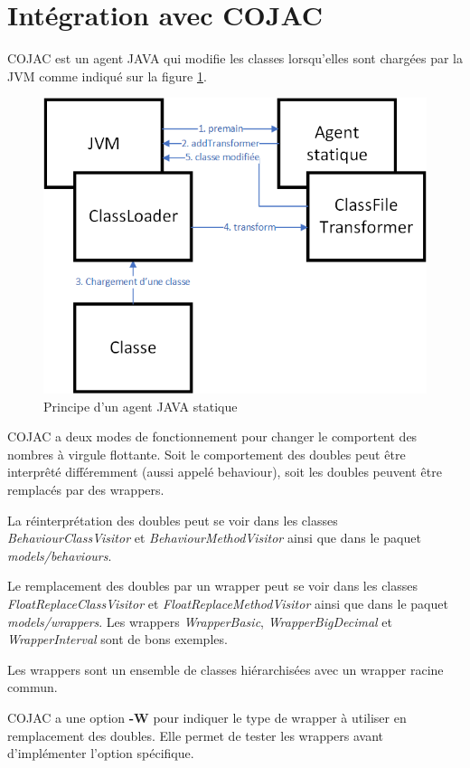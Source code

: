 \documentclass[11pt]{meetingmins}
\begin{document}
\section{Intégration avec COJAC}
\begin{hiddenitems}
    \item COJAC est un agent JAVA qui modifie les classes lorsqu'elles sont chargées par la JVM comme indiqué sur la figure \ref{fig:static_agent}.
    \begin{figure}[ht]
        \centering
        \includegraphics[width=0.7\linewidth]{images/static_agent.png}
        \caption{Principe d'un agent JAVA statique}
        \label{fig:static_agent}
    \end{figure}
    \item COJAC a deux modes de fonctionnement pour changer le comportent des nombres à virgule flottante. Soit le comportement des doubles peut être interprêté différemment (aussi appelé behaviour), soit les doubles peuvent être remplacés par des wrappers.
    \item La réinterprétation des doubles peut se voir dans les classes \textit{BehaviourClassVisitor} et \textit{BehaviourMethodVisitor} ainsi que dans le paquet \textit{models/behaviours}.
    \item Le remplacement des doubles par un wrapper peut se voir dans les classes \textit{FloatReplaceClassVisitor} et \textit{FloatReplaceMethodVisitor} ainsi que dans le paquet \textit{models/wrappers}. Les wrappers \textit{WrapperBasic}, \textit{WrapperBigDecimal} et \textit{WrapperInterval} sont de bons exemples.
    
    \item Les wrappers sont un ensemble de classes hiérarchisées avec un wrapper racine commun.
    \item COJAC a une option \textbf{-W} pour indiquer le type de wrapper à utiliser en remplacement des doubles. Elle permet de tester les wrappers avant d'implémenter l'option spécifique.
\end{hiddenitems}
\end{document}
